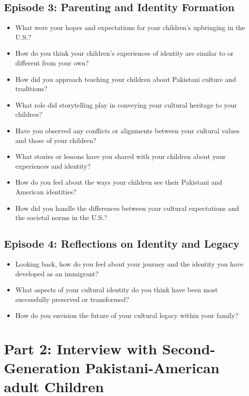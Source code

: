 \subsection{Episode 3: Parenting and Identity Formation}

\begin{itemize}
    \item What were your hopes and expectations for your children’s upbringing in the U.S.?
    \item How do you think your children’s experiences of identity are similar to or different from your own?
    \item How did you approach teaching your children about Pakistani culture and traditions?
    \item What role did storytelling play in conveying your cultural heritage to your children?
    \item Have you observed any conflicts or alignments between your cultural values and those of your children?
    \item What stories or lessons have you shared with your children about your experiences and identity?
    \item How do you feel about the ways your children see their Pakistani and American identities?
    \item How did you handle the differences between your cultural expectations and the societal norms in the U.S.?
\end{itemize}

\subsection{Episode 4: Reflections on Identity and Legacy}

\begin{itemize}
    \item Looking back, how do you feel about your journey and the identity you have developed as an immigrant?
    \item What aspects of your cultural identity do you think have been most successfully preserved or transformed?
    \item How do you envision the future of your cultural legacy within your family?
\end{itemize}

\section{Part 2: Interview with Second-Generation Pakistani-American adult Children}

